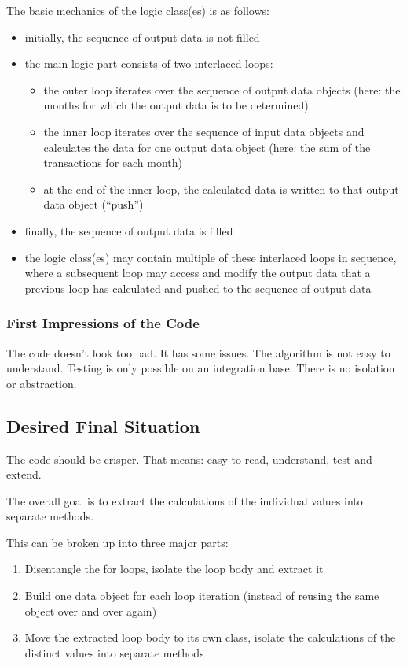 \documentclass[a4paper,fleqn,titlepage,11pt]{article}
\begin{document}
The basic mechanics of the logic class(es) is as follows:

\begin{itemize}
\item initially, the sequence of output data is not filled
\item the main logic part consists of two interlaced loops: 
\begin{itemize}
\item the outer loop iterates over the sequence of output data objects (here: the months for which the output data is to be determined)
\item the inner loop iterates over the sequence of input data objects and calculates the data for one output data object (here: the sum of the transactions for each month)
\item at the end of the inner loop, the calculated data is written to that output data object (``push'')
\end{itemize}
\item finally, the sequence of output data is filled
\item the logic class(es) may contain multiple of these interlaced loops in sequence, where a subsequent loop may access and modify the output data that a previous loop has calculated and pushed to the sequence of output data
\end{itemize}

\subsubsection*{First Impressions of the Code}
The code doesn't look too bad. It has some issues. The algorithm is not easy to understand. Testing is only possible on an integration base. There is no isolation or abstraction.

\subsection*{Desired Final Situation}

The code should be crisper. That means: easy to read, understand, test and extend.

The overall goal is to extract the calculations of the individual values into separate methods.

This can be broken up into three major parts:

\begin{enumerate}
\item Disentangle the for loops, isolate the loop body and extract it
\item Build one data object for each loop iteration (instead of reusing the same object over and over again)

\item Move the extracted loop body to its own class, isolate the calculations of the distinct values into separate methods
\end{enumerate}
\end{document}
